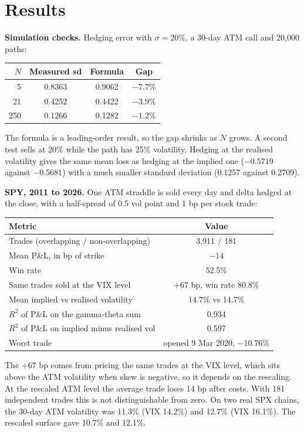 \documentclass[11pt,a4paper]{article}
\begin{document}
\section{Results}
\textbf{Simulation checks.} Hedging error with $\sigma=20\%$, a 30-day ATM call and 20,000 paths:

\begin{center}
\begin{tabular}{@{}rccc@{}}
\toprule
$N$ & Measured sd & Formula & Gap \\
\midrule
5 & 0.8363 & 0.9062 & $-7.7\%$ \\
21 & 0.4252 & 0.4422 & $-3.9\%$ \\
250 & 0.1266 & 0.1282 & $-1.2\%$ \\
\bottomrule
\end{tabular}
\end{center}
The formula is a leading-order result, so the gap shrinks as $N$ grows. A second test sells at 20\% while the path has 25\% volatility. Hedging at the realised volatility gives the same mean loss as hedging at the implied one ($-0.5719$ against $-0.5681$) with a much smaller standard deviation (0.1257 against 0.2709).

\textbf{SPY, 2011 to 2026.} One ATM straddle is sold every day and delta hedged at the close, with a half-spread of 0.5 vol point and 1 bp per stock trade:

\begin{center}
\begin{tabular}{@{}lc@{}}
\toprule
Metric & Value \\
\midrule
Trades (overlapping / non-overlapping) & 3,911 / 181 \\
Mean P\&L, in bp of strike & $-14$ \\
Win rate & 52.5\% \\
Same trades sold at the VIX level & $+67$ bp, win rate 80.8\% \\
Mean implied vs realised volatility & 14.7\% vs 14.7\% \\
$R^2$ of P\&L on the gamma-theta sum & 0.934 \\
$R^2$ of P\&L on implied minus realised vol & 0.597 \\
Worst trade & opened 9 Mar 2020, $-10.76\%$ \\
\bottomrule
\end{tabular}
\end{center}
The $+67$ bp comes from pricing the same trades at the VIX level, which sits above the ATM volatility when skew is negative, so it depends on the rescaling. At the rescaled ATM level the average trade loses 14 bp after costs. With 181 independent trades this is not distinguishable from zero. On two real SPX chains, the 30-day ATM volatility was 11.3\% (VIX 14.2\%) and 12.7\% (VIX 16.1\%). The rescaled surface gave 10.7\% and 12.1\%.
\end{document}
